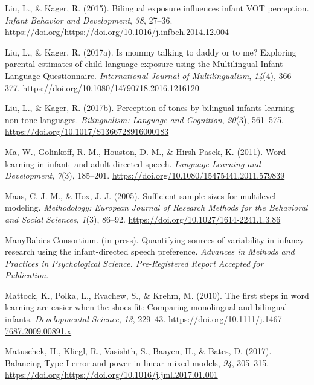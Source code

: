 \documentclass[,man,floatsintext]{apa6}
\begin{document}
\leavevmode\hypertarget{ref-liu_2015}{}%
Liu, L., \& Kager, R. (2015). Bilingual exposure influences infant VOT perception. \emph{Infant Behavior and Development}, \emph{38}, 27--36. \url{https://doi.org/https://doi.org/10.1016/j.infbeh.2014.12.004}

\leavevmode\hypertarget{ref-liu_2017a}{}%
Liu, L., \& Kager, R. (2017a). Is mommy talking to daddy or to me? Exploring parental estimates of child language exposure using the Multilingual Infant Language Questionnaire. \emph{International Journal of Multilingualism}, \emph{14}(4), 366--377. \url{https://doi.org/10.1080/14790718.2016.1216120}

\leavevmode\hypertarget{ref-liu_2017b}{}%
Liu, L., \& Kager, R. (2017b). Perception of tones by bilingual infants learning non-tone languages. \emph{Bilingualism: Language and Cognition}, \emph{20}(3), 561--575. \url{https://doi.org/10.1017/S1366728916000183}

\leavevmode\hypertarget{ref-ma_2011}{}%
Ma, W., Golinkoff, R. M., Houston, D. M., \& Hirsh-Pasek, K. (2011). Word learning in infant- and adult-directed speech. \emph{Language Learning and Development}, \emph{7}(3), 185--201. \url{https://doi.org/10.1080/15475441.2011.579839}

\leavevmode\hypertarget{ref-maas_2005}{}%
Maas, C. J. M., \& Hox, J. J. (2005). Sufficient sample sizes for multilevel modeling. \emph{Methodology: European Journal of Research Methods for the Behavioral and Social Sciences}, \emph{1}(3), 86--92. \url{https://doi.org/10.1027/1614-2241.1.3.86}

\leavevmode\hypertarget{ref-manybabies_consortium_2020}{}%
ManyBabies Consortium. (in press). Quantifying sources of variability in infancy research using the infant-directed speech preference. \emph{Advances in Methods and Practices in Psychological Science. Pre-Registered Report Accepted for Publication}.

\leavevmode\hypertarget{ref-mattock_2010}{}%
Mattock, K., Polka, L., Rvachew, S., \& Krehm, M. (2010). The first steps in word learning are easier when the shoes fit: Comparing monolingual and bilingual infants. \emph{Developmental Science}, \emph{13}, 229--43. \url{https://doi.org/10.1111/j.1467-7687.2009.00891.x}

\leavevmode\hypertarget{ref-matuschek_2017}{}%
Matuschek, H., Kliegl, R., Vasishth, S., Baayen, H., \& Bates, D. (2017). Balancing Type I error and power in linear mixed models, \emph{94}, 305--315. \url{https://doi.org/https://doi.org/10.1016/j.jml.2017.01.001}
\end{document}
